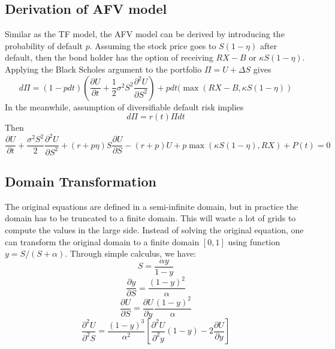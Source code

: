 \documentclass[12pt]{article}
\begin{document}
\subsection{Derivation of AFV model}
Similar as the TF model, the AFV model can be derived by introducing the probability of default $p$. Assuming the stock price goes to $S(1-\eta)$ after default, then the bond holder has the option of receiving $RX-B$ or $\kappa S(1-\eta)$. Applying the Black Scholes argument to the portfolio $\Pi = U + \Delta S$ gives
\begin{equation*}
d\Pi = (1-pdt)(\frac{\partial U}{\partial t} + \frac{1}{2}\sigma^2S^2\frac{\partial^2U}{\partial S^2}) + pdt(\max(RX - B, \kappa S(1-\eta))
\end{equation*}
In the meanwhile, assumption of diversifiable default risk implies
\begin{equation*}
d\Pi = r(t)\Pi dt
\end{equation*}
Then
\begin{equation*}
\frac{\partial{U}}{\partial{t}} + 
\frac{\sigma^2S^2}{2}\frac{\partial^2{U}}{\partial{S}^2} + (r + p\eta)S\frac{\partial{U}}{\partial{S}} - (r+p)U + p\max(\kappa S(1-\eta), RX) + P(t) = 0 
\end{equation*}

\subsection{Domain Transformation}
The original equations are defined in a semi-infinite domain, but in practice the domain has to be truncated to a finite domain. This will waste a lot of grids to compute the values in the large side. Instead of solving the original equation, one can transform the original domain to a finite domain $[0, 1]$ using function $y = S/(S+\alpha)$. Through simple calculus, we have:
\begin{equation*}
S = \frac{\alpha y}{1 - y}
\end{equation*}
\begin{equation*}
\frac{\partial y}{\partial S} = \frac{(1-y)^2}{\alpha}
\end{equation*}
\begin{equation*}
\frac{\partial U}{\partial S} = \frac{\partial U}{\partial y}\frac{(1-y)^2}{\alpha}
\end{equation*}
\begin{equation*}
\frac{\partial^2U}{\partial^2 S} = \frac{(1-y)^3}{\alpha^2}[\frac{\partial^2U}{\partial^2y}(1-y) - 2\frac{\partial U}{\partial y}]
\end{equation*}
\end{document}

